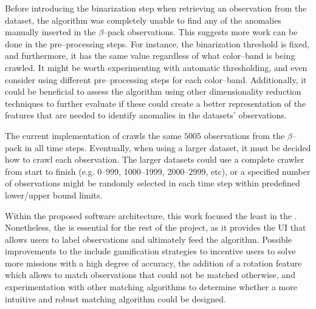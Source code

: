 Before introducing the binarization step when retrieving an observation from the dataset, the \mlblink algorithm was completely unable to find any of the anomalies manually inserted in the $\beta$--pack observations. This suggests more work can be done in the pre--processing steps. For instance, the binarization threshold is fixed, and furthermore, it has the same value regardless of what \panstarrs color--band is being crawled. It might be worth experimenting with automatic thresholding, and even consider using different pre--processing steps for each color--band. Additionally, it could be beneficial to assess the algorithm using other dimensionality reduction techniques to further evaluate if these could create a better representation of the features that are needed to identify anomalies in the datasets' observations. \newline

The current implementation of \mlblink crawls the same $5005$ observations from the $\beta$--pack in all time steps. Eventually, when using a larger dataset, it must be decided how to crawl each observation. The larger datasets could use a complete crawler from start to finish (e.g. 0--999, 1000--1999, 2000--2999, etc), or a specified number of observations might be randomly selected in each time step within predefined lower/upper bound limits. \newline

Within the proposed \vasco software architecture, this work focused the least in the \mlblinkui. Nonetheless, the \mlblinkui is essential for the rest of the project, as it provides the UI that allows users to label observations and ultimately feed the \mlblink algorithm. Possible improvements to the \mlblinkui include gamification strategies to incentive users to solve more missions with a high degree of accuracy, the addition of a rotation feature which allows to match observations that could not be matched otherwise, and experimentation with other matching algorithms to determine whether a more intuitive and robust matching algorithm could be designed. \newline